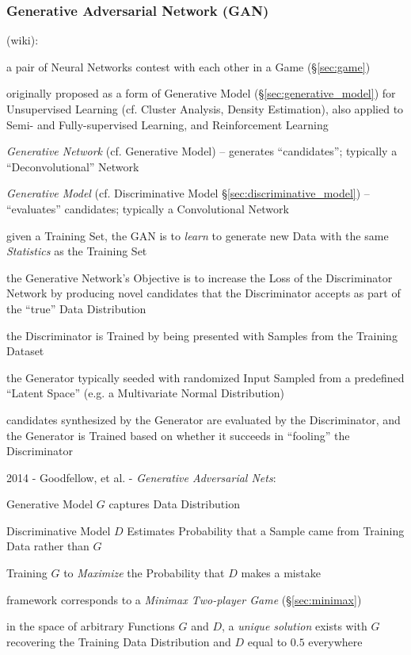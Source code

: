 \subsubsection{Generative Adversarial Network (GAN)}\label{sec:gan}

(wiki):

a pair of Neural Networks contest with each other in a Game (\S\ref{sec:game})

originally proposed as a form of Generative Model
(\S\ref{sec:generative_model}) for Unsupervised Learning (cf. Cluster Analysis,
Density Estimation),
also applied to Semi- and Fully-supervised Learning, and Reinforcement Learning

\emph{Generative Network} (cf. Generative Model) -- generates ``candidates'';
typically a ``Deconvolutional'' Network

\emph{Generative Model} (cf. Discriminative Model
\S\ref{sec:discriminative_model}) -- ``evaluates'' candidates; typically a
Convolutional Network

given a Training Set, the GAN is to \emph{learn} to generate new Data with the
same \emph{Statistics} as the Training Set

the Generative Network's Objective is to increase the Loss of the Discriminator
Network by producing novel candidates that the Discriminator accepts as part of
the ``true'' Data Distribution

the Discriminator is Trained by being presented with Samples from the Training
Dataset

the Generator typically seeded with randomized Input Sampled from a predefined
``Latent Space'' (e.g. a Multivariate Normal Distribution)

candidates synthesized by the Generator are evaluated by the Discriminator, and
the Generator is Trained based on whether it succeeds in ``fooling'' the
Discriminator

2014 - Goodfellow, et al. - \emph{Generative Adversarial Nets}:

Generative Model $G$ captures Data Distribution

Discriminative Model $D$ Estimates Probability that a Sample came from Training
Data rather than $G$

Training $G$ to \emph{Maximize} the Probability that $D$ makes a mistake

framework corresponds to a \emph{Minimax Two-player Game} (\S\ref{sec:minimax})

in the space of arbitrary Functions $G$ and $D$, a \emph{unique solution} exists
with $G$ recovering the Training Data Distribution and $D$ equal to $0.5$
everywhere


